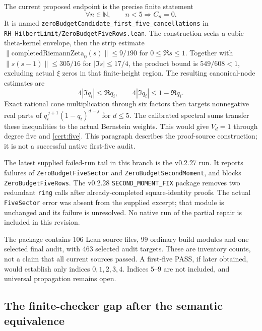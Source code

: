 \documentclass[11pt,a4paper]{article}
\numberwithin{equation}{section}
\theoremstyle{definition}
\theoremstyle{remark}
\newcommand{\N}{\mathbb N}
\begin{document}
The current proposed endpoint is the precise finite statement
\begin{equation}\label{cert:five}
\forall n\in\N,\qquad n<5\Longrightarrow C_n=0.
\end{equation}
It is named \nolinkurl{zeroBudgetCandidate_first_five_cancellations}
in \nolinkurl{RH_HilbertLimit/ZeroBudgetFiveRows.lean}.
The construction seeks a cubic theta-kernel envelope, then the strip
estimate $\|\mathrm{completedRiemannZeta}_0(s)\|\le9/190$ for
$0\le\Re s\le1$. Together with
$\|s(s-1)\|\le305/16$ for $|\Im s|\le17/4$, the product bound is
$549/608<1$, excluding actual $\xi$ zeros in that finite-height region.
The resulting canonical-node estimates are
\begin{equation}\label{cert:four-wedge}
4|\Im q_i|\le\Re q_i,\qquad
4|\Im q_i|\le1-\Re q_i.
\end{equation}
Exact rational cone multiplication through six factors then targets
nonnegative real parts of
$q_i^{\,j+1}(1-q_i)^{d-j}$ for $d\le5$.
The calibrated spectral sums transfer these inequalities to the actual
Bernstein weights. This would give $V_d=1$ through degree five and
\eqref{cert:five}. This paragraph describes the proof-source construction;
it is not a successful native first-five audit.

The latest supplied failed-run tail in this branch is the
v0.2.27 run. It reports failures of \texttt{ZeroBudgetFiveSector} and
\texttt{ZeroBudgetSecondMoment}, and blocks \texttt{ZeroBudgetFiveRows}.
The v0.2.28 \texttt{SECOND\_MOMENT\_FIX} package removes two redundant
\texttt{ring} calls after already-completed square-identity proofs.
The actual \texttt{FiveSector} error was absent from the supplied excerpt;
that module is unchanged and its failure is unresolved. No native run of
the partial repair is included in this revision.

The package contains 106 Lean source files, 99 ordinary build modules
and one selected final audit, with 463 selected audit targets. These are
inventory counts, not a claim that all current sources passed. A first-five
PASS, if later obtained, would establish only indices $0,1,2,3,4$.
Indices $5$--$9$ are not included, and universal propagation remains open.

\subsection{The finite-checker gap after the semantic equivalence}
\end{document}

